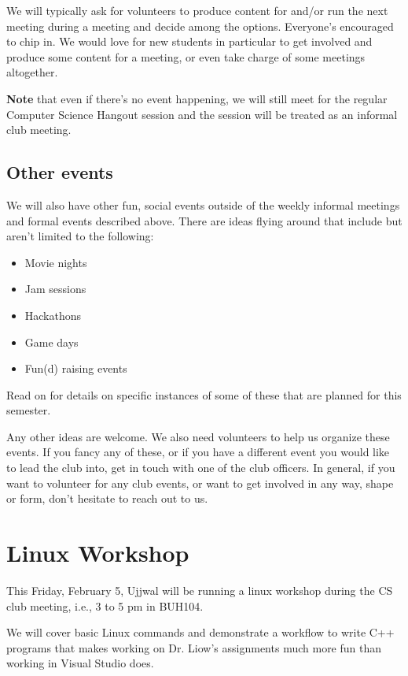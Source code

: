 We will typically ask for volunteers to produce content for and/or run the next
meeting during a meeting and decide among the options. Everyone's encouraged to
chip in. We would love for new students in particular to get involved and
produce some content for a meeting, or even take charge of some meetings
altogether.

\textbf{Note} that even if there's no event happening, we will still meet for the
regular Computer Science Hangout session and the session will be treated as an
informal club meeting.

\newpage

\subsection{Other events}
\label{sec-2-6}

We will also have other fun, social events outside of the weekly informal
meetings and formal events described above. There are ideas flying around that
include but aren't limited to the following:
\begin{itemize}
\item Movie nights
\item Jam sessions
\item Hackathons
\item Game days
\item Fun(d) raising events
\end{itemize}

Read on for details on specific instances of some of these that are planned for
this semester.

Any other ideas are welcome. We also need volunteers to help us organize these
events. If you fancy any of these, or if you have a different event you would
like to lead the club into, get in touch with one of the club officers. In
general, if you want to volunteer for any club events, or want to get involved
in any way, shape or form, don't hesitate to reach out to us.


\newpage


\section{Linux Workshop}
\label{sec-3}

This Friday, February 5, Ujjwal will be running a linux workshop during the CS club
meeting, i.e., 3 to 5 pm in BUH104.

We will cover basic Linux commands and demonstrate a workflow to write C++
programs that makes working on Dr. Liow's assignments much more fun than
working in Visual Studio does.

